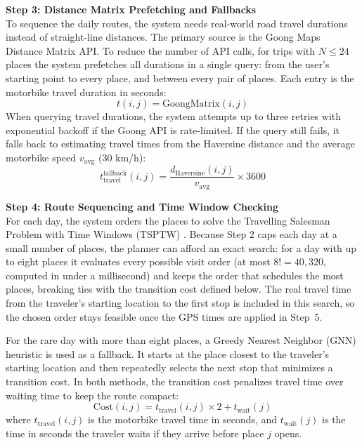 \documentclass[a4paper,12pt]{report}
\begin{document}
\textbf{Step 3: Distance Matrix Prefetching and Fallbacks}
\\ To sequence the daily routes, the system needs real-world road travel durations instead of straight-line distances. The primary source is the Goong Maps Distance Matrix API. To reduce the number of API calls, for trips with $N \le 24$ places the system prefetches all durations in a single query: from the user's starting point to every place, and between every pair of places. Each entry is the motorbike travel duration in seconds:
\[
t(i, j) = \text{GoongMatrix}(i, j)
\]
When querying travel durations, the system attempts up to three retries with exponential backoff if the Goong API is rate-limited. If the query still fails, it falls back to estimating travel times from the Haversine distance and the average motorbike speed $v_{\text{avg}}$ (30 km/h):
\[
t_{\text{travel}}^{\text{fallback}}(i, j) = \frac{d_{\text{Haversine}}(i, j)}{v_{\text{avg}}} \times 3600
\]

\textbf{Step 4: Route Sequencing and Time Window Checking}
\\ For each day, the system orders the places to solve the Travelling Salesman Problem with Time Windows (TSPTW) \cite{solomon1987tsptw}. Because Step 2 caps each day at a small number of places, the planner can afford an exact search: for a day with up to eight places it evaluates every possible visit order (at most $8! = 40{,}320$, computed in under a millisecond) and keeps the order that schedules the most places, breaking ties with the transition cost defined below. The real travel time from the traveler's starting location to the first stop is included in this search, so the chosen order stays feasible once the GPS times are applied in Step~5.

For the rare day with more than eight places, a Greedy Nearest Neighbor (GNN) heuristic is used as a fallback. It starts at the place closest to the traveler's starting location and then repeatedly selects the next stop that minimizes a transition cost. In both methods, the transition cost penalizes travel time over waiting time to keep the route compact:
\[
\text{Cost}(i, j) = t_{\text{travel}}(i, j) \times 2 + t_{\text{wait}}(j)
\]
where $t_{\text{travel}}(i, j)$ is the motorbike travel time in seconds, and $t_{\text{wait}}(j)$ is the time in seconds the traveler waits if they arrive before place $j$ opens. 
\end{document}
